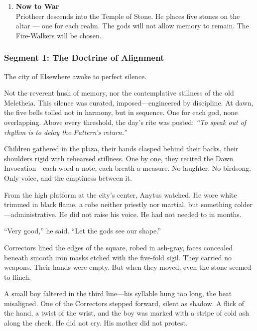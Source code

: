 \documentclass[9pt]{article}
\begin{document}
\begin{center}
\begin{enumerate}
    \vspace{.3in}
    \item \textbf{Now to War} \\
    Priotheer descends into the Temple of Stone. He places five stones on the altar — one for each realm. The gods will not allow memory to remain. The Fire-Walkers will be chosen.
\end{enumerate}
\end{center}

\newpage

\subsubsection*{Segment 1: The Doctrine of Alignment}

The city of Elsewhere awoke to perfect silence.

Not the reverent hush of memory, nor the contemplative stillness of the old Meletheia. This silence was curated, imposed—engineered by discipline. At dawn, the five bells tolled not in harmony, but in sequence. One for each god, none overlapping. Above every threshold, the day's rite was posted: \textit{“To speak out of rhythm is to delay the Pattern’s return.”}

Children gathered in the plaza, their hands clasped behind their backs, their shoulders rigid with rehearsed stillness. One by one, they recited the Dawn Invocation—each word a note, each breath a measure. No laughter. No birdsong. Only voice, and the emptiness between it.

From the high platform at the city’s center, Anytus watched. He wore white trimmed in black flame, a robe neither priestly nor martial, but something colder—administrative. He did not raise his voice. He had not needed to in months.

“Very good,” he said. “Let the gods see our shape.”

Correctors lined the edges of the square, robed in ash-gray, faces concealed beneath smooth iron masks etched with the five-fold sigil. They carried no weapons. Their hands were empty. But when they moved, even the stone seemed to flinch.

A small boy faltered in the third line—his syllable hung too long, the beat misaligned. One of the Correctors stepped forward, silent as shadow. A flick of the hand, a twist of the wrist, and the boy was marked with a stripe of cold ash along the cheek. He did not cry. His mother did not protest.
\end{document}
